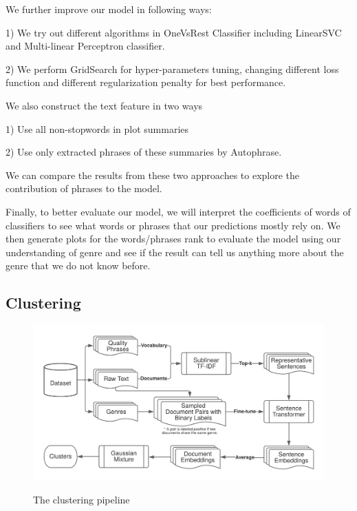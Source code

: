 \documentclass{article}
\begin{document}
\begin{multicols}{2}
   
   
   
   We further improve our model in following ways: 
   
   1) We try out different algorithms in OneVsRest Classifier including LinearSVC and Multi-linear Perceptron classifier. 
   
   2) We perform GridSearch for hyper-parameters tuning, changing different loss function and different regularization penalty for best performance.
   
   We also construct the text feature in two ways
   
   1) Use all non-stopwords in plot summaries
   
   2) Use only extracted phrases of these summaries by Autophrase.
   
   We can compare the results from these two approaches to explore the contribution of phrases to the model.
   
   Finally, to better evaluate our model, we will interpret the coefficients of words of classifiers to see what words or phrases that our predictions mostly rely on. We then generate plots for the words/phrases rank to evaluate the model using our understanding of genre and see if the result can tell us anything more about the genre that we do not know before. 
   
   
   
\subsection{Clustering}

\begin{figure}
\caption{The clustering pipeline}
\centering
\includegraphics[width=5in]{figures/clustering_pipeline.png}
\label{figure:clustering_pipeline}
\end{figure}


\end{multicols}
\end{document}
